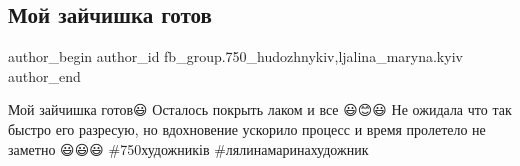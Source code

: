  
 
 
 
 

\subsection{Мой зайчишка готов}
\label{sec:20_03_2018.fb.fb_group.750_hudozhnykiv.1.moj_zajchishka_gotov}
 
\ifcmt
 author_begin
   author_id fb_group.750_hudozhnykiv,ljalina_maryna.kyiv
 author_end
\fi

Мой зайчишка готов😃 Осталось покрыть лаком и все 😃😊😃 Не ожидала что так
быстро его разресую, но вдохновение ускорило  процесс и время пролетело не
заметно 😃😃😃 \#750художників \#лялинамаринахудожник

